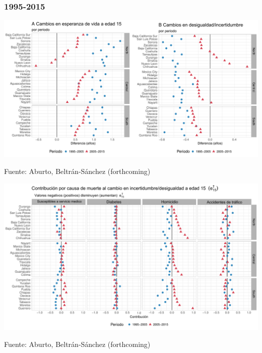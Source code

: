 \documentclass[xcolor={dvipsnames}]{beamer}
\begin{document}
\begin{frame}\frametitle{1995-2015}

\Large{
				\begin{center}
		\hbox{\hspace{-2em}\includegraphics[scale=.38]{Figures/Changes_2005-15}}
				\end{center}		
\vspace{-2em}\tiny{Fuente: Aburto, Beltr\'an-S\'anchez (forthcoming)}		

}
\end{frame}

\begin{frame}
\Large{
				\begin{center}
		\hbox{\hspace{-2em}\includegraphics[scale=.38]{Figures/Changes_2005-15b}}
				\end{center}				
\vspace{-2em}\tiny{Fuente: Aburto, Beltr\'an-S\'anchez (forthcoming)}		

}
\end{frame}

\begin{frame}
\Large{

\begin{center}		
				\end{center}
				
}
\end{frame}
\end{document}
